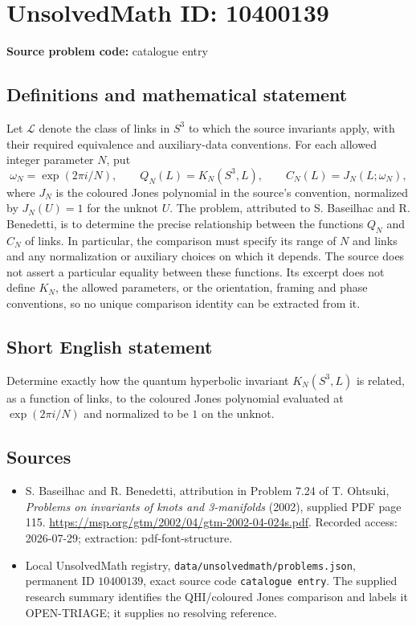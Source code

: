 \documentclass[11pt]{article}
\begin{document}
\section*{UnsolvedMath ID: 10400139}
\textbf{Source problem code:} catalogue entry
\subsection{Definitions and mathematical statement}
Let \(\mathcal L\) denote the class of links in \(S^3\) to which the source invariants apply, with their required equivalence and auxiliary-data conventions. For each allowed integer parameter \(N\), put
\[
 \omega_N=\exp(2\pi i/N),\qquad
 Q_N(L)=K_N(S^3,L),\qquad C_N(L)=J_N(L;\omega_N),
\]
where \(J_N\) is the coloured Jones polynomial in the source's convention, normalized by \(J_N(U)=1\) for the unknot \(U\). The problem, attributed to S. Baseilhac and R. Benedetti, is to determine the precise relationship between the functions \(Q_N\) and \(C_N\) of links. In particular, the comparison must specify its range of \(N\) and links and any normalization or auxiliary choices on which it depends. The source does not assert a particular equality between these functions. Its excerpt does not define \(K_N\), the allowed parameters, or the orientation, framing and phase conventions, so no unique comparison identity can be extracted from it.
\subsection{Short English statement}
Determine exactly how the quantum hyperbolic invariant \(K_N(S^3,L)\) is related, as a function of links, to the coloured Jones polynomial evaluated at \(\exp(2\pi i/N)\) and normalized to be \(1\) on the unknot.
\subsection{Sources}
\begin{itemize}
\item S. Baseilhac and R. Benedetti, attribution in Problem 7.24 of T. Ohtsuki, \emph{Problems on invariants of knots and 3-manifolds} (2002), supplied PDF page 115. \url{https://msp.org/gtm/2002/04/gtm-2002-04-024s.pdf}. Recorded access: 2026-07-29; extraction: pdf-font-structure.
\item Local UnsolvedMath registry, \texttt{data/unsolvedmath/problems.json}, permanent ID \(10400139\), exact source code \texttt{catalogue entry}. The supplied research summary identifies the QHI/coloured Jones comparison and labels it OPEN-TRIAGE; it supplies no resolving reference.
\end{itemize}
\end{document}
